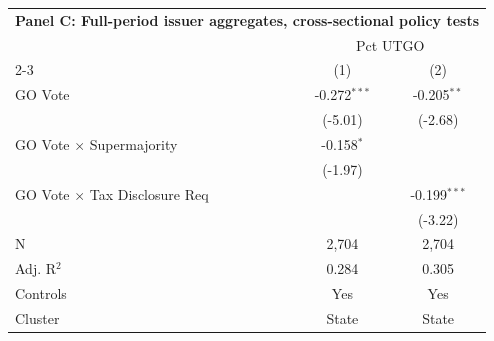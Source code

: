 \begingroup
\centering
\begin{tabular*}{\textwidth}{@{\extracolsep{\fill}}lcc}
\multicolumn{3}{l}{\textbf{Panel C: Full-period issuer aggregates, cross-sectional policy tests}}\\

\addlinespace
   \toprule
    & \multicolumn{2}{c}{Pct UTGO}\\
   \cmidrule(lr){2-3}
                                        & (1)            & (2)\\  
   \midrule 
   GO Vote                              & -0.272$^{***}$ & -0.205$^{**}$\\   
                                        & (-5.01)       & (-2.68)\\   
   GO Vote $\times$ Supermajority       & -0.158$^{*}$   &   \\   
                                        & (-1.97)       &   \\   
   GO Vote $\times$ Tax Disclosure Req  &                & -0.199$^{***}$\\   
                                        &                & (-3.22)\\   
   \hline
   N                         & 2,704          & 2,704\\  
   Adj. R$^2$                       & 0.284          & 0.305\\  
   Controls                   & Yes            & Yes\\
   Cluster              & State & State\\  
   \bottomrule
\end{tabular*}
\par\endgroup
